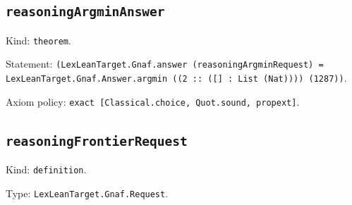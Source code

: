 \documentclass[11pt]{article}
\begin{document}
\subsection*{\texttt{reasoningArgminAnswer}}
\noindent Kind: \texttt{theorem}.\par
\noindent Statement: \texttt{(LexLeanTarget.Gnaf.answer (reasoningArgminRequest) = LexLeanTarget.Gnaf.Answer.argmin ((2 :: ([] : List (Nat)))) (1287))}.\par
\noindent Axiom policy: \texttt{exact [Classical.choice, Quot.sound, propext]}.\par
\subsection*{\texttt{reasoningFrontierRequest}}
\noindent Kind: \texttt{definition}.\par
\noindent Type: \texttt{LexLeanTarget.Gnaf.Request}.\par
\end{document}
